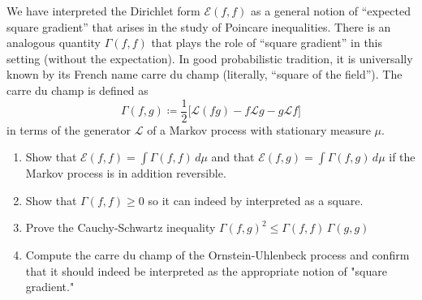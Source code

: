 \documentclass{article}
\theoremstyle{definition}
\theoremstyle{remark}
\theoremstyle{definition}
\begin{document}
  \begin{exercise}
  We have interpreted the Dirichlet form $\mathcal{E}(f, f)$ as a general notion of “expected square gradient” that arises in the study of Poincare inequalities. There is an analogous quantity $\Gamma(f, f)$ that plays the role of “square gradient” in this setting (without the expectation). In good probabilistic tradition, it is universally known by its French name carre du champ (literally, “square of the field”). The carre du champ is defined as
  \[\Gamma(f, g) \coloneqq \frac{1}{2} \big[ \mathscr{L}(f g) - f \mathscr{L} g - g \mathscr{L} f \big] \]
  in terms of the generator $\mathscr{L}$ of a Markov process with stationary measure $\mu$. 
  \begin{enumerate}
      \item Show that $\mathcal{E}(f, f) = \int \Gamma(f, f) \, d\mu$ and that $\mathcal{E}(f, g) = \int \Gamma(f, g) \,d\mu$ if the Markov process is in addition reversible. 
      \item Show that $\Gamma(f, f) \geq 0$ so it can indeed by interpreted as a square. 
      \item Prove the Cauchy-Schwartz inequality $\Gamma(f, g)^2 \leq \Gamma(f, f) \, \Gamma(g, g)$ 
      \item Compute the carre du champ of the Ornstein-Uhlenbeck process and confirm that it should indeed be interpreted as the appropriate notion of "square gradient." 
  \end{enumerate}
  \end{exercise}
\end{document}
